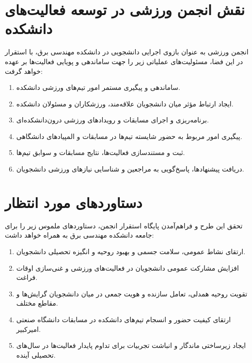 \documentclass[12pt,a4paper]{article}
\begin{document}
\section{نقش انجمن ورزشی در توسعه فعالیت‌های دانشکده}
انجمن ورزشی به عنوان بازوی اجرایی دانشجویی در دانشکده مهندسی برق، با استقرار در این فضا، مسئولیت‌های عملیاتی زیر را جهت ساماندهی و پویایی فعالیت‌ها بر عهده خواهد گرفت:
\begin{enumerate}
    \item ساماندهی و پیگیری مستمر امور تیم‌های ورزشی دانشکده.
    \item ایجاد ارتباط مؤثر میان دانشجویان علاقه‌مند، ورزشکاران و مسئولان دانشکده.
    \item برنامه‌ریزی و اجرای مسابقات و رویدادهای ورزشی درون‌دانشکده‌ای.
    \item پیگیری امور مربوط به حضور شایسته تیم‌ها در مسابقات و المپیادهای دانشگاهی.
    \item ثبت و مستندسازی فعالیت‌ها، نتایج مسابقات و سوابق تیم‌ها.
    \item دریافت پیشنهادها، پاسخ‌گویی به مراجعین و شناسایی نیازهای ورزشی دانشجویان.
\end{enumerate}

\section{دستاوردهای مورد انتظار}
تحقق این طرح و فراهم‌آمدن پایگاه استقرار انجمن، دستاوردهای ملموس زیر را برای جامعه دانشکده مهندسی برق به همراه خواهد داشت:
\begin{enumerate}
    \item ارتقای نشاط عمومی، سلامت جسمی و بهبود روحیه و انگیزه تحصیلی دانشجویان.
    \item افزایش مشارکت عمومی دانشجویان در فعالیت‌های ورزشی و غنی‌سازی اوقات فراغت.
    \item تقویت روحیه همدلی، تعامل سازنده و هویت جمعی در میان دانشجویان گرایش‌ها و مقاطع مختلف.
    \item ارتقای کیفیت حضور و انسجام تیم‌های دانشکده در مسابقات دانشگاه صنعتی امیرکبیر.
    \item ایجاد زیرساختی ماندگار و انباشت تجربیات برای تداوم پایدار فعالیت‌ها در سال‌های تحصیلی آینده.
\end{enumerate}
\end{document}

